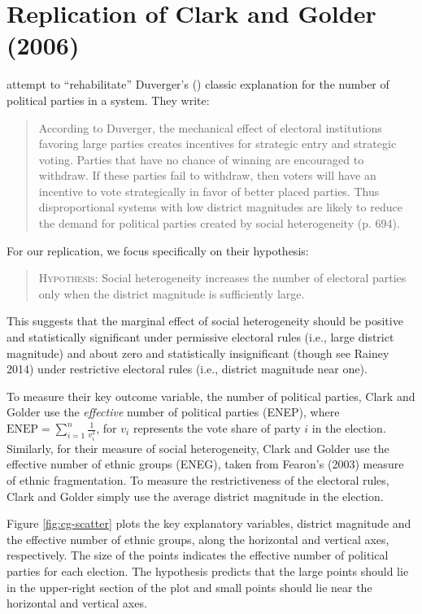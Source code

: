 \documentclass[12pt]{article}
\begin{document}
\section*{Replication of Clark and Golder (2006)}

\cite{ClarkGolder2006} attempt to ``rehabilitate'' Duverger's (\citeyear{Duverger1963}) classic explanation for the number of political parties in a system.
They write: 

\begin{quote}
According to Duverger, the mechanical effect of electoral institutions favoring large parties creates incentives for strategic entry and strategic voting. 
Parties that have no chance of winning are encouraged to withdraw. 
If these parties fail to withdraw, then voters will have an incentive to vote strategically in favor of better placed parties. 
Thus disproportional systems with low district magnitudes are likely to reduce the demand for political parties created by social heterogeneity (p. 694).
\end{quote}

For our replication, we focus specifically on their hypothesis:
\begin{quote}
\textsc{Hypothesis:} Social heterogeneity increases the number of electoral parties only when the district magnitude is sufficiently large.
\end{quote}

This suggests that the marginal effect of social heterogeneity should be positive and statistically significant under permissive electoral rules (i.e., large district magnitude) and about zero and statistically insignificant (though see Rainey 2014) under restrictive electoral rules (i.e., district magnitude near one).

To measure their key outcome variable, the number of political parties, Clark and Golder use the \textit{effective} number of political parties (ENEP), where $\text{ENEP} = \sum_{i = 1}^n\frac{1}{v_i^2}$, for $v_i$ represents the vote share of party $i$ in the election. 
Similarly, for their measure of social heterogeneity, Clark and Golder use the effective number of ethnic groups (ENEG), taken from Fearon's (2003) measure of ethnic fragmentation. 
To measure the restrictiveness of the electoral rules, Clark and Golder simply use the average district magnitude in the election. 

Figure \ref{fig:cg-scatter} plots the key explanatory variables, district magnitude and the effective number of ethnic groups, along the horizontal and vertical axes, respectively. 
The size of the points indicates the effective number of political parties for each election. 
The hypothesis predicts that the large points should lie in the upper-right section of the plot and small points should lie near the horizontal and vertical axes.
\end{document}
